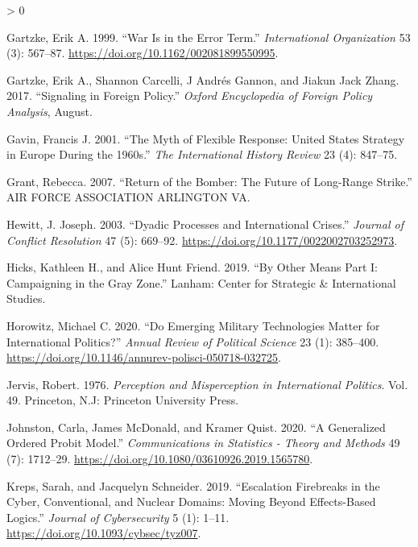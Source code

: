 \documentclass[
]{article}
\newlength{\cslhangindent}
\newenvironment{CSLReferences}[2] %
 {%
  \setlength{\parindent}{0pt}
  \ifodd #1 \everypar{\setlength{\hangindent}{\cslhangindent}}\ignorespaces\fi
  \ifnum #2 > 0
  \setlength{\parskip}{#2\baselineskip}
  \fi
 }%
 {}
\begin{document}
\begin{CSLReferences}{1}{0}
\leavevmode\hypertarget{ref-gartzke_warerrorterm_1999}{}%
Gartzke, Erik A. 1999. {``War {Is} in the {Error Term}.''} \emph{International Organization} 53 (3): 567--87. \url{https://doi.org/10.1162/002081899550995}.

\leavevmode\hypertarget{ref-gartzke_signalingforeignpolicy_2017}{}%
Gartzke, Erik A., Shannon Carcelli, J Andrés Gannon, and Jiakun Jack Zhang. 2017. {``Signaling in {Foreign Policy}.''} \emph{Oxford Encyclopedia of Foreign Policy Analysis}, August.

\leavevmode\hypertarget{ref-gavin_mythflexibleresponse_2001}{}%
Gavin, Francis J. 2001. {``The {Myth} of {Flexible Response}: {United States Strategy} in {Europe} During the 1960s.''} \emph{The International History Review} 23 (4): 847--75.

\leavevmode\hypertarget{ref-grant_returnbomberfuture_2007}{}%
Grant, Rebecca. 2007. {``Return of the {Bomber}: {The Future} of {Long-Range Strike}.''} {AIR FORCE ASSOCIATION ARLINGTON VA}.

\leavevmode\hypertarget{ref-hewitt_dyadicprocessesinternational_2003}{}%
Hewitt, J. Joseph. 2003. {``Dyadic {Processes} and {International Crises}.''} \emph{Journal of Conflict Resolution} 47 (5): 669--92. \url{https://doi.org/10.1177/0022002703252973}.

\leavevmode\hypertarget{ref-hicks_othermeanspart_2019}{}%
Hicks, Kathleen H., and Alice Hunt Friend. 2019. {``By {Other Means Part I}: {Campaigning} in the {Gray Zone}.''} {Lanham}: {Center for Strategic \& International Studies}.

\leavevmode\hypertarget{ref-horowitz_emergingmilitarytechnologies_2020}{}%
Horowitz, Michael C. 2020. {``Do {Emerging Military Technologies Matter} for {International Politics}?''} \emph{Annual Review of Political Science} 23 (1): 385--400. \url{https://doi.org/10.1146/annurev-polisci-050718-032725}.

\leavevmode\hypertarget{ref-jervis_perceptionmisperceptioninternational_1976}{}%
Jervis, Robert. 1976. \emph{Perception and Misperception in International Politics}. Vol. 49. {Princeton, N.J}: {Princeton University Press}.

\leavevmode\hypertarget{ref-johnston_generalizedorderedprobit_2020}{}%
Johnston, Carla, James McDonald, and Kramer Quist. 2020. {``A Generalized Ordered {Probit} Model.''} \emph{Communications in Statistics - Theory and Methods} 49 (7): 1712--29. \url{https://doi.org/10.1080/03610926.2019.1565780}.

\leavevmode\hypertarget{ref-kreps_escalationfirebreakscyber_2019}{}%
Kreps, Sarah, and Jacquelyn Schneider. 2019. {``Escalation Firebreaks in the Cyber, Conventional, and Nuclear Domains: Moving Beyond Effects-Based Logics.''} \emph{Journal of Cybersecurity} 5 (1): 1--11. \url{https://doi.org/10.1093/cybsec/tyz007}.


\end{CSLReferences}
\end{document}
